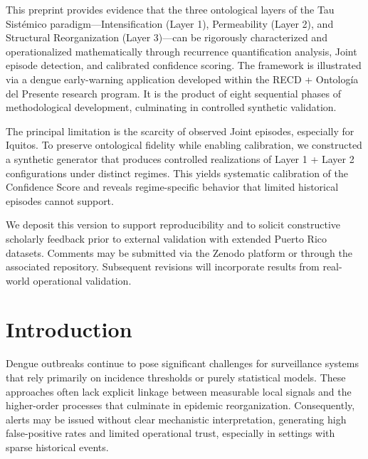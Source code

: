 \documentclass[11pt,a4paper]{article}
\begin{document}
\begin{zenodolletter}
This preprint provides evidence that the three ontological layers of the Tau Sistémico paradigm---Intensification (Layer 1), Permeability (Layer 2), and Structural Reorganization (Layer 3)---can be rigorously characterized and operationalized mathematically through recurrence quantification analysis, Joint episode detection, and calibrated confidence scoring. The framework is illustrated via a dengue early-warning application developed within the RECD + Ontología del Presente research program. It is the product of eight sequential phases of methodological development, culminating in controlled synthetic validation.

The principal limitation is the scarcity of observed Joint episodes, especially for Iquitos. To preserve ontological fidelity while enabling calibration, we constructed a synthetic generator that produces controlled realizations of Layer 1 + Layer 2 configurations under distinct regimes. This yields systematic calibration of the Confidence Score and reveals regime-specific behavior that limited historical episodes cannot support.

We deposit this version to support reproducibility and to solicit constructive scholarly feedback prior to external validation with extended Puerto Rico datasets. Comments may be submitted via the Zenodo platform or through the associated repository. Subsequent revisions will incorporate results from real-world operational validation.
\end{zenodolletter}

\vspace{0.5em}

\section{Introduction}

Dengue outbreaks continue to pose significant challenges for surveillance systems that rely primarily on incidence thresholds or purely statistical models. These approaches often lack explicit linkage between measurable local signals and the higher-order processes that culminate in epidemic reorganization. Consequently, alerts may be issued without clear mechanistic interpretation, generating high false-positive rates and limited operational trust, especially in settings with sparse historical events.
\end{document}
